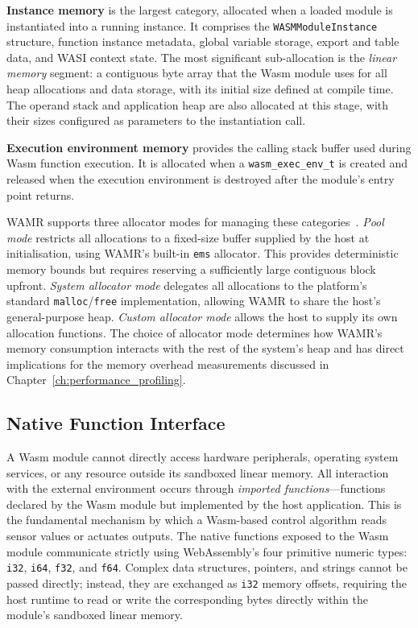 \documentclass[12pt, a4paper]{report}
\begin{document}
\textbf{Instance memory} is the largest category, allocated when a loaded module is
instantiated into a running instance. It comprises the \texttt{WASMModuleInstance} structure,
function instance metadata, global variable storage, export and table data, and WASI context
state. The most significant sub-allocation is the \textit{linear memory} segment: a
contiguous byte array that the Wasm module uses for all heap allocations and data storage,
with its initial size defined at compile time. The operand stack and application heap are
also allocated at this stage, with their sizes configured as parameters to the instantiation
call.

\textbf{Execution environment memory} provides the calling stack buffer used during Wasm
function execution. It is allocated when a \texttt{wasm\_exec\_env\_t} is created and
released when the execution environment is destroyed after the module's entry point returns.

WAMR supports three allocator modes for managing these categories~\cite{wamr-memory-model}.
\textit{Pool mode} restricts all allocations to a fixed-size buffer supplied by the host at
initialisation, using WAMR's built-in \texttt{ems} allocator. This provides deterministic
memory bounds but requires reserving a sufficiently large contiguous block upfront.
\textit{System allocator mode} delegates all allocations to the platform's standard
\texttt{malloc}/\texttt{free} implementation, allowing WAMR to share the host's
general-purpose heap. \textit{Custom allocator mode} allows the host to supply its own
allocation functions. The choice of allocator mode determines how WAMR's memory consumption
interacts with the rest of the system's heap and has direct implications for the memory
overhead measurements discussed in Chapter~\ref{ch:performance_profiling}.

\subsection{Native Function Interface}
\label{subsec:wamr-host}

A Wasm module cannot directly access hardware peripherals, operating system services, or any resource outside its sandboxed linear memory. All interaction with the external environment occurs through \textit{imported functions}---functions declared by the Wasm module but implemented by the host application. This is the fundamental mechanism by which a Wasm-based control algorithm reads sensor values or actuates outputs. The native functions exposed to the Wasm module communicate strictly using WebAssembly's four primitive numeric types: \texttt{i32}, \texttt{i64}, \texttt{f32}, and \texttt{f64}. Complex data structures, pointers, and strings cannot be passed directly; instead, they are exchanged as \texttt{i32} memory offsets, requiring the host runtime to read or write the corresponding bytes directly within the module's sandboxed linear memory.
\end{document}
